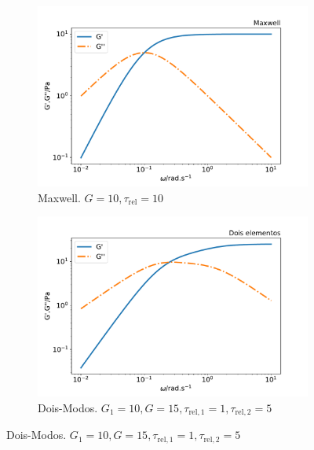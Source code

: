 			\begin{figure}[h]
				\begin{subfigure}[t]{.5\textwidth}
					\centering
					\includegraphics[width=\textwidth]{./imagens/reologia/modelos_comparativo_max}
					\caption{Maxwell. \(G=10, \tau_{\mathrm{rel}}=10\)}
					\label{fig:comparativo_modelo_maxwell}
				\end{subfigure}%
				\begin{subfigure}[t]{.5\textwidth}
					\centering
					\includegraphics[width=\textwidth]{./imagens/reologia/modelos_comparativo_doismodos}
					\caption{Dois-Modos. \(G_1=10, G=15, \tau_{\mathrm{rel,1}}=1,  \tau_{\mathrm{rel,2}}=5\)}
					\label{fig:comparativo_modelo_doismodos}
				\end{subfigure}
			

\end{figure}
